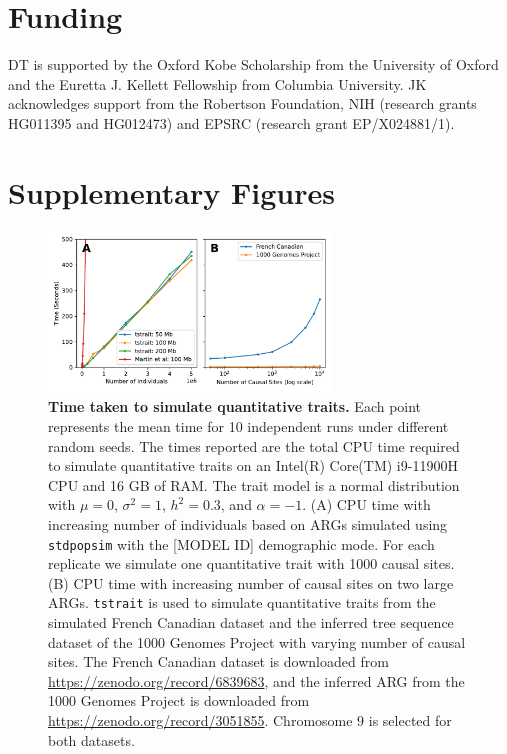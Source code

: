 \documentclass[unnumsec,webpdf,modern,large,namedate]{oup-authoring-template}%
\begin{document}
\section{Funding}
DT is supported by the Oxford Kobe Scholarship from the University of Oxford
and the Euretta J. Kellett Fellowship from Columbia University.
JK acknowledges support from the Robertson Foundation,
NIH (research grants HG011395 and HG012473) and
EPSRC (research grant EP/X024881/1).





\clearpage

\renewcommand\thefigure{S\arabic{figure}}
\setcounter{figure}{0}
\renewcommand\thetable{S\arabic{table}}
\setcounter{table}{0}
\section{Supplementary Figures}

\begin{figure}[t]%
\centering
\includegraphics[width=213pt]{figures/time-scaling.pdf}
\caption{\textbf{Time taken to simulate quantitative traits.} Each point
represents the mean time for 10 independent runs under different random seeds.
The times reported are the total CPU time required to simulate quantitative
traits on an Intel(R) Core(TM) i9-11900H CPU and 16 GB of RAM. The trait model
is a normal distribution with $\mu=0$, $\sigma^2=1$, $h^2=0.3$, and
$\alpha=-1$. (A) CPU time with increasing number of individuals
based on ARGs simulated using \texttt{stdpopsim} with the [MODEL ID]
demographic mode. For each replicate we simulate
one quantitative trait with 1000 causal sites.
(B) CPU time with increasing number of causal sites on two large ARGs.
\texttt{tstrait} is used to simulate quantitative traits from
the simulated French Canadian dataset \citep{anderson2023} and the inferred
tree sequence dataset of the 1000 Genomes Project \citep{kelleher2019} with
varying number of causal sites. The French Canadian dataset is downloaded from
\url{https://zenodo.org/record/6839683}, and the inferred ARG from the 1000
Genomes Project is downloaded from \url{https://zenodo.org/record/3051855}.
Chromosome 9 is selected for both datasets.}\label{fig:time}
\end{figure}
\end{document}
